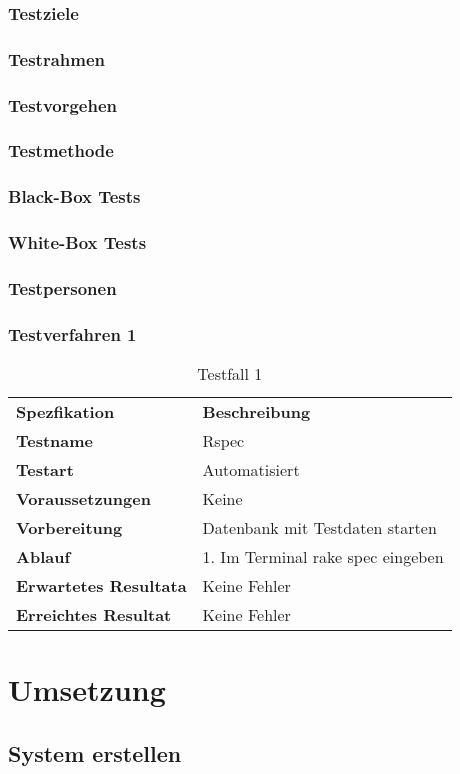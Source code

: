 \subsection{Testziele}
\subsection{Testrahmen}
\subsection{Testvorgehen}
\subsection{Testmethode}
\subsection{Black-Box Tests}
\subsection{White-Box Tests}
\subsection{Testpersonen}
\subsection{Testverfahren 1}
\begin{table}[H]
    \begin{tabular}{|l|l|}
        \hline
        \rowcolor{puzzleblue} \multicolumn{2}{|l|}{Testfall Nr. 1}  \\[10pt]
        \hline
        \textbf{Spezfikation} & \textbf{Beschreibung} \\
        \hline
        \rowcolor{puzzleblue!25}\textbf{Testname} & Rspec \\
        \hline
        \textbf{Testart} & Automatisiert \\
        \hline
        \rowcolor{puzzleblue!25}\textbf{Voraussetzungen} & Keine \\
        \hline
        \textbf{Vorbereitung} & Datenbank mit Testdaten starten \\
        \hline
        \rowcolor{puzzleblue!25}\textbf{Ablauf} & 1. Im Terminal rake spec eingeben \\
        \hline
        \textbf{Erwartetes Resultata} & Keine Fehler \\
        \hline
        \rowcolor{puzzleblue!25}\textbf{Erreichtes Resultat} & Keine Fehler \\
        \hline
    \end{tabular}
    \caption{Testfall 1}
\end{table}
\chapter{Umsetzung}
\section{System erstellen}
